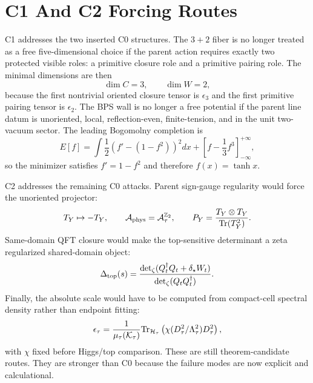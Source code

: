 \documentclass[11pt]{article}
\begin{document}
\section{C1 And C2 Forcing Routes}
C1 addresses the two inserted C0 structures.  The $3+2$ fiber is no longer
treated as a free five-dimensional choice if the parent action requires exactly
two protected visible roles: a primitive closure role and a primitive pairing
role.  The minimal dimensions are then
\begin{equation}
\dim C=3,\qquad \dim W=2,
\end{equation}
because the first nontrivial oriented closure tensor is $\epsilon_3$ and the
first primitive pairing tensor is $\epsilon_2$.  The BPS wall is no longer a
free potential if the parent line datum is unoriented, local, reflection-even,
finite-tension, and in the unit two-vacuum sector.  The leading Bogomolny
completion is
\begin{equation}
E[f]=\int\frac12\left(f'-(1-f^2)\right)^2dx+
\left[ f-\frac13 f^3\right]_{-\infty}^{+\infty},
\end{equation}
so the minimizer satisfies $f'=1-f^2$ and therefore $f(x)=\tanh x$.

C2 addresses the remaining C0 attacks.  Parent sign-gauge regularity would
force the unoriented projector:
\begin{equation}
T_Y\mapsto -T_Y,\qquad
{\cal A}_{\rm phys}={\cal A}_\tau^{\mathbb Z_2},
\qquad
P_Y=\frac{T_Y\otimes T_Y}{{\rm Tr}(T_Y^2)} .
\end{equation}
Same-domain QFT closure would make the top-sensitive determinant a zeta
regularized shared-domain object:
\begin{equation}
\Delta_{\rm top}(s)=
\frac{\det_\zeta(Q_t^\dagger Q_t+\delta_\star W_t)}
{\det_\zeta(Q_tQ_t^\dagger)} .
\end{equation}
Finally, the absolute scale would have to be computed from compact-cell
spectral density rather than endpoint fitting:
\begin{equation}
\epsilon_\tau
=
\frac{1}{\mu_\tau({\cal K}_\tau)}
{\rm Tr}_{{\cal H}_\tau}\left(\chi(D_\tau^2/\Lambda_\tau^2)D_\tau^2\right),
\end{equation}
with $\chi$ fixed before Higgs/top comparison.  These are still
theorem-candidate routes.  They are stronger than C0 because the failure modes
are now explicit and calculational.
\end{document}
